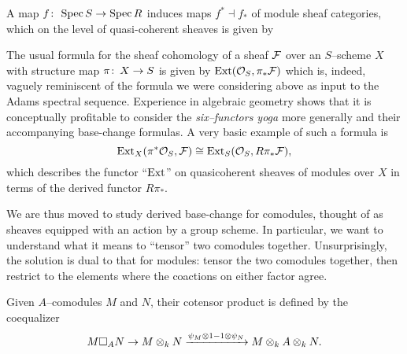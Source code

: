 \begin{definition}
A map $f\colon\thinspace \operatorname{Spec} S \to \operatorname{Spec} R$ induces maps $f^* \dashv f_*$ of module sheaf categories, which on the level of quasi-coherent sheaves is given by
\begin{center}
\end{center}
\end{definition}

The usual formula for the sheaf cohomology of a sheaf $\mathcal{F}$ over an $S$--scheme $X$ with structure map $\pi\colon\thinspace X \to S$ is given by $\operatorname{Ext}(\mathcal{O}_S, \pi_* \mathcal{F})$ which is, indeed, vaguely reminiscent of the formula we were considering above as input to the Adams spectral sequence.  Experience in algebraic geometry shows that it is conceptually profitable to consider the \emph{six--functors yoga} more generally and their accompanying base-change formulas.  A very basic example of such a formula is \[\operatorname{Ext}_X(\pi^* \mathcal{O}_S, \mathcal{F}) \cong \operatorname{Ext}_S(\mathcal{O}_S, R\pi_* \mathcal{F}),\] which describes the functor ``$\operatorname{Ext}$'' on quasicoherent sheaves of modules over $X$ in terms of the derived functor $R\pi_*$.

We are thus moved to study derived base-change for comodules, thought of as sheaves equipped with an action by a group scheme.  In particular, we want to understand what it means to ``tensor'' two comodules together.  Unsurprisingly, the solution is dual to that for modules: tensor the two comodules together, then restrict to the elements where the coactions on either factor agree.

\begin{definition}
Given $A$--comodules $M$ and $N$, their cotensor product is defined by the coequalizer \[M \square_A N \to M \otimes_k N \xrightarrow{\psi_M \otimes 1 - 1 \otimes \psi_N} M \otimes_k A \otimes_k N.\]
\end{definition}

